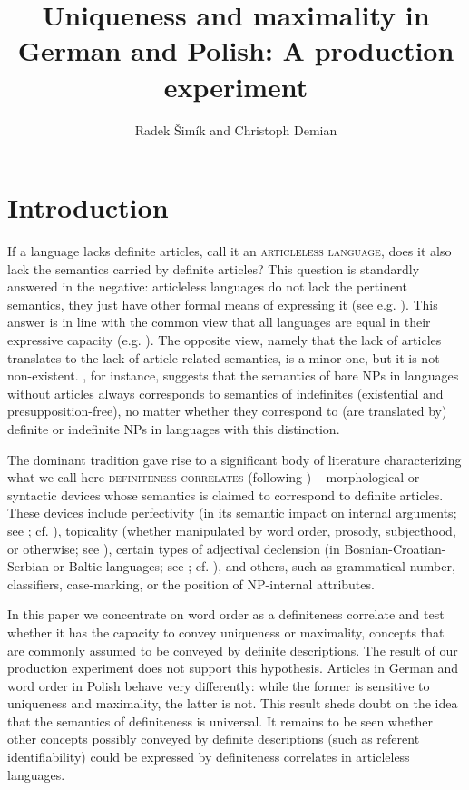 \documentclass[output=paper]{langscibook}
\author{Radek Šimík\orcid{0000-0002-4736-195X}\affiliation{Charles University, Prague} and Christoph Demian\affiliation{Humboldt-Universität zu Berlin}}
\title{Uniqueness and maximality in German and Polish: A production experiment}
\begin{document}
\maketitle

\section{Introduction}\label{sim-dem:sec:intro}

If a language lacks definite articles, call it an \textsc{articleless language}, does it also lack the semantics carried by definite articles? This question is standardly answered in the negative: articleless languages do not lack the pertinent semantics, they just have other formal means of expressing it (see e.g. \citealt{Kramsky1972}). This answer is in line with the common view that all languages are equal in their expressive capacity (e.g. \citealt{Aronoff2007}). The opposite view, namely that the lack of articles translates to the lack of article-related semantics, is a minor one, but it is not non-existent. \citet{Heim2011}, for instance, suggests that the semantics of bare NPs in languages without articles always corresponds to semantics of indefinites (existential and presupposition-free), no matter whether they correspond to (are translated by) definite or indefinite NPs in languages with this distinction.

The dominant tradition gave rise to a significant body of literature characterizing what we call here \textsc{definiteness correlates} (following \citealt{Simik.Demian2020}) -- morphological or syntactic devices whose semantics is claimed to correspond to definite articles. These devices include perfectivity (in its semantic impact on internal arguments; see \citealt{Krifka1989}; cf. \citealt{Filip1993,Filip1996}), topicality (whether manipulated by word order, prosody, subjecthood, or otherwise; see \citealt{Li.Thompson1976,Geist2010,Jenks2018}), certain types of adjectival declension (in Bosnian-Croatian-Serbian or Baltic languages; see \citealt{Hlebec1986,Progovac1998,Leko1999,Holvoet.Sprauniene2012,Serekaite2019}; cf. \citealt{Trenkic2004,Stankovic2015}), and others, such as grammatical number, classifiers, case-mark\-ing, or the position of NP-internal attributes.

In this paper we concentrate on word order as a definiteness correlate and test whether it has the capacity
to convey uniqueness or maximality, concepts that are commonly assumed to be conveyed by definite descriptions. The result of our production experiment does not support this hypothesis. Articles in German and word order in Polish behave very differently: while the former is sensitive to uniqueness and maximality, the latter is not. This result sheds doubt on the idea that the semantics of definiteness is universal.
It remains to be seen whether other concepts possibly conveyed by definite descriptions (such as referent identifiability) could be expressed by definiteness correlates in articleless languages.
\end{document}
